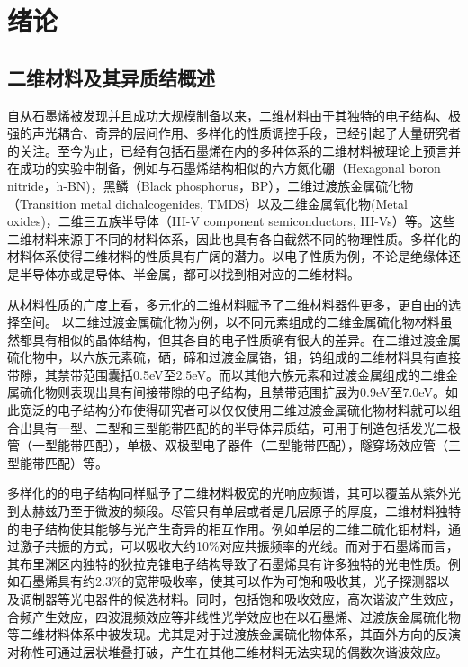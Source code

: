 \chapter{绪\hspace{6pt}论}

\section{二维材料及其异质结概述}
自从石墨烯被发现并且成功大规模制备以来，二维材料由于其独特的电子结构、极强的声光耦合、奇异的层间作用、多样化的性质调控手段，已经引起了大量研究者的关注。至今为止，已经有包括石墨烯在内的多种体系的二维材料被理论上预言并在成功的实验中制备，例如与石墨烯结构相似的六方氮化硼（Hexagonal boron nitride，h-BN)，黑鳞（Black phosphorus，BP），二维过渡族金属硫化物（Transition metal dichalcogenides, TMDS）以及二维金属氧化物(Metal oxides)，二维三五族半导体（III-V component semiconductors, III-Vs）等。这些二维材料来源于不同的材料体系，因此也具有各自截然不同的物理性质。多样化的材料体系使得二维材料的性质具有广阔的潜力。以电子性质为例，不论是绝缘体还是半导体亦或是导体、半金属，都可以找到相对应的二维材料。

从材料性质的广度上看，多元化的二维材料赋予了二维材料器件更多，更自由的选择空间。
以二维过渡金属硫化物为例，以不同元素组成的二维金属硫化物材料虽然都具有相似的晶体结构，但其各自的电子性质确有很大的差异。在二维过渡金属硫化物中，以六族元素硫，硒，碲和过渡金属铬，钼，钨组成的二维材料具有直接带隙，其禁带范围囊括0.5eV至2.5eV。而以其他六族元素和过渡金属组成的二维金属硫化物则表现出具有间接带隙的电子结构，且禁带范围扩展为0.9eV至7.0eV。如此宽泛的电子结构分布使得研究者可以仅仅使用二维过渡金属硫化物材料就可以组合出具有一型、二型和三型能带匹配的的半导体异质结，可用于制造包括发光二极管（一型能带匹配），单极、双极型电子器件（二型能带匹配），隧穿场效应管（三型能带匹配）等。

多样化的的电子结构同样赋予了二维材料极宽的光响应频谱，其可以覆盖从紫外光到太赫兹乃至于微波的频段。尽管只有单层或者是几层原子的厚度，二维材料独特的电子结构使其能够与光产生奇异的相互作用。例如单层的二维二硫化钼材料，通过激子共振的方式，可以吸收大约10\%对应共振频率的光线。而对于石墨烯而言，其布里渊区内独特的狄拉克锥电子结构导致了石墨烯具有许多独特的光电性质。例如石墨烯具有约2.3\%的宽带吸收率，使其可以作为可饱和吸收其，光子探测器以及调制器等光电器件的候选材料。同时，包括饱和吸收效应，高次谐波产生效应，合频产生效应，四波混频效应等非线性光学效应也在以石墨烯、过渡族金属硫化物等二维材料体系中被发现。尤其是对于过渡族金属硫化物体系，其面外方向的反演对称性可通过层状堆叠打破，产生在其他二维材料无法实现的偶数次谐波效应。


